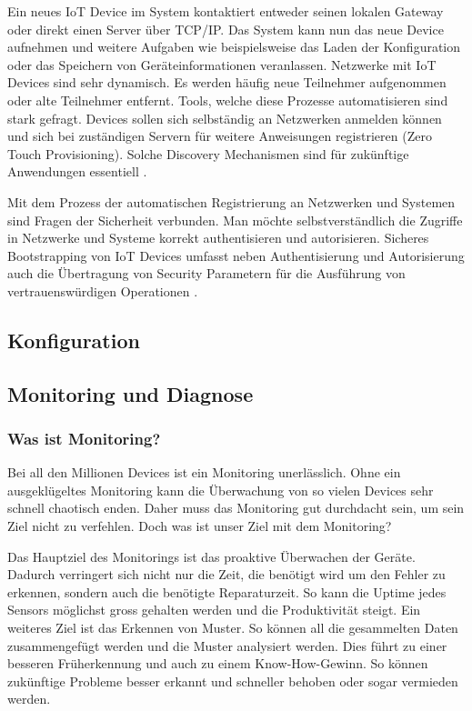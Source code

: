 Ein neues IoT Device im System kontaktiert entweder seinen lokalen Gateway oder direkt einen Server über TCP/IP. Das System kann nun das neue Device aufnehmen und weitere Aufgaben wie beispielsweise das Laden der Konfiguration oder das Speichern von Geräteinformationen veranlassen. Netzwerke mit IoT Devices sind sehr dynamisch. Es werden häufig neue Teilnehmer aufgenommen oder alte Teilnehmer entfernt. Tools, welche diese Prozesse automatisieren sind stark gefragt. Devices sollen sich selbständig an Netzwerken anmelden können und sich bei zuständigen Servern für weitere Anweisungen registrieren (Zero Touch Provisioning). Solche Discovery Mechanismen sind für zukünftige Anwendungen essentiell \cite{IoTDiscovery10}.

Mit dem Prozess der automatischen Registrierung an Netzwerken und Systemen sind Fragen der Sicherheit verbunden. Man möchte selbstverständlich die Zugriffe in Netzwerke und Systeme korrekt authentisieren und autorisieren. Sicheres Bootstrapping von IoT Devices umfasst neben Authentisierung und Autorisierung auch die Übertragung von Security Parametern für die Ausführung von vertrauenswürdigen Operationen \cite{IoTSecurityChallenges}.
\subsection{Konfiguration}

\subsection{Monitoring und Diagnose}
\subsubsection{Was ist Monitoring?}
Bei all den Millionen Devices ist ein Monitoring unerlässlich. Ohne ein ausgeklügeltes Monitoring kann die Überwachung von so vielen Devices sehr schnell chaotisch enden. Daher muss das Monitoring gut durchdacht sein, um sein Ziel nicht zu verfehlen. Doch was ist unser Ziel mit dem Monitoring?

Das Hauptziel des Monitorings ist das proaktive Überwachen der Geräte. Dadurch verringert sich nicht nur die Zeit, die benötigt wird um den Fehler zu erkennen, sondern auch die benötigte Reparaturzeit. So kann die Uptime jedes Sensors möglichst gross gehalten werden und die Produktivität steigt. Ein weiteres Ziel ist das Erkennen von Muster. So können all die gesammelten Daten zusammengefügt werden und die Muster analysiert werden. Dies führt zu einer besseren Früherkennung und auch zu einem Know-How-Gewinn. So können zukünftige Probleme besser erkannt und schneller behoben oder sogar vermieden werden.\cite{MonZiele}

